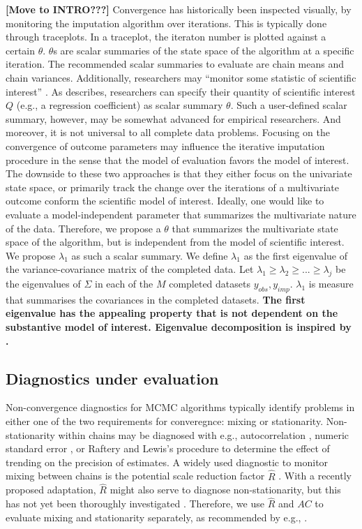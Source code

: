 \documentclass[Royal,times,sageh]{sagej}
\begin{document}
\textbf{{[}Move to INTRO???{]}} Convergence has historically been
inspected visually, by monitoring the imputation algorithm over
iterations. This is typically done through traceplots. In a traceplot,
the iteraton number is plotted against a certain \(\theta\). \(\theta\)s
are scalar summaries of the state space of the algorithm at a specific
iteration. The recommended scalar summaries to evaluate are chain means
and chain variances. Additionally, researchers may ``monitor some
statistic of scientific interest'' \citep[\(\S\) 6.5.2]{buur18}. As
\citet{buur18} describes, researchers can specify their quantity of
scientific interest \(Q\) (e.g., a regression coefficient) as scalar
summary \(\theta\). Such a user-defined scalar summary, however, may be
somewhat advanced for empirical researchers. And moreover, it is not
universal to all complete data problems. Focusing on the convergence of
outcome parameters may influence the iterative imputation procedure in
the sense that the model of evaluation favors the model of interest. The
downside to these two approaches is that they either focus on the
univariate state space, or primarily track the change over the
iterations of a multivariate outcome conform the scientific model of
interest. Ideally, one would like to evaluate a model-independent
parameter that summarizes the multivariate nature of the data.
Therefore, we propose a \(\theta\) that summarizes the multivariate
state space of the algorithm, but is independent from the model of
scientific interest. We propose \(\lambda_1\) as such a scalar summary.
We define \(\lambda_1\) as the first eigenvalue of the
variance-covariance matrix of the completed data. Let
\(\lambda_1 \geq \lambda_2 \geq ... \geq \lambda_j\) be the eigenvalues
of \(\Sigma\) in each of the \(M\) completed datasets
\({y_{obs}, y_{imp}}\). \(\lambda_1\) is measure that summarises the
covariances in the completed datasets. \textbf{The first eigenvalue has
the appealing property that is not dependent on the substantive model of
interest. Eigenvalue decomposition is inspired by \citet{mack03}.}

\hypertarget{diagnostics-under-evaluation}{%
\subsection{Diagnostics under
evaluation}\label{diagnostics-under-evaluation}}

Non-convergence diagnostics for MCMC algorithms typically identify
problems in either one of the two requirements for converegnce: mixing
or stationarity. Non-stationarity within chains may be diagnosed with
e.g., autocorrelation \citep[\(AC\);][]{scha97, gelm13}, numeric
standard error \citep[`MC error';][]{gewe92}, or Raftery and Lewis's
\citeyearpar{raft91} procedure to determine the effect of trending on
the precision of estimates. A widely used diagnostic to monitor mixing
between chains is the potential scale reduction factor \(\widehat{R}\)
\citep[`Gelman-Rubin statistic';][]{gelm92}. With a recently proposed
adaptation, \(\widehat{R}\) might also serve to diagnose
non-stationarity, but this has not yet been thoroughly investigated
\citep{veht19}. Therefore, we use \(\widehat{R}\) and \(AC\) to evaluate
mixing and stationarity separately, as recommended by e.g.,
\citet{cowl96}.
\end{document}
